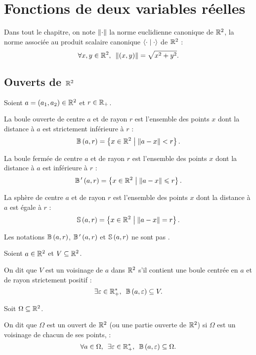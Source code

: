 \chapter{Fonctions de deux variables réelles}

\minitoc

Dans tout le chapitre, on note \(\left\|\cdot\right\|\) la norme euclidienne canonique de \(\mathbb{R}^2\), \cad la norme associée au produit scalaire canonique \(\left\langle\cdot\;\middle|\;\cdot\right\rangle\) de \(\mathbb{R}^2\) : \[\quantifs{\forall x,y\in\R^2}\norme{\paren{x,y}}=\sqrt{x^2+y^2}.\]

\section{Ouverts de \(\mathbb{R}^2\)}

\begin{defi}[Boules]
Soient \(a=\left(a_1,a_2\right)\in\mathbb{R}^2\) et \(r\in\mathbb{R}_+\).

La boule ouverte de centre \(a\) et de rayon \(r\) est l'ensemble des points \(x\) dont la distance à \(a\) est strictement inférieure à \(r\) : \[\mathbb{B}\left(a,r\right)=\left\lbrace x\in\mathbb{R}^2\;\middle|\;\left\|a-x\right\|<r\right\rbrace.\]

La boule fermée de centre \(a\) et de rayon \(r\) est l'ensemble des points \(x\) dont la distance à \(a\) est inférieure à \(r\) : \[\mathbb{B}^{\,\prime}\left(a,r\right)=\left\lbrace x\in\mathbb{R}^2\;\middle|\;\left\|a-x\right\|\leqslant r\right\rbrace.\]

La sphère de centre \(a\) et de rayon \(r\) est l'ensemble des points \(x\) dont la distance à \(a\) est égale à \(r\) : \[\mathbb{S}\left(a,r\right)=\left\lbrace x\in\mathbb{R}^2\;\middle|\;\left\|a-x\right\|=r\right\rbrace.\]

Les notations \(\mathbb{B}\left(a,r\right)\), \(\mathbb{B}^{\,\prime}\left(a,r\right)\) et \(\mathbb{S}\left(a,r\right)\) ne sont pas .
\end{defi}

\begin{defi}
Soient \(a\in\mathbb{R}^2\) et \(V\subseteq\mathbb{R}^2\).

On dit que \(V\) est un voisinage de \(a\) dans \(\mathbb{R}^2\) s'il contient une boule centrée en \(a\) et de rayon strictement positif : \[\quantifs{\exists\epsilon\in\Rps}\bouleo{a}{\epsilon}\subset V.\]
\end{defi}

\begin{defi}[Ouvert]
Soit \(\Omega\subseteq\mathbb{R}^2\).

On dit que \(\Omega\) est un ouvert de \(\mathbb{R}^2\) (ou une partie ouverte de \(\mathbb{R}^2\)) si \(\Omega\) est un voisinage de chacun de ses points, \cad : \[\quantifs{\forall a\in\Omega;\exists\epsilon\in\Rps}\bouleo{a}{\epsilon}\subset\Omega.\]
\end{defi}


